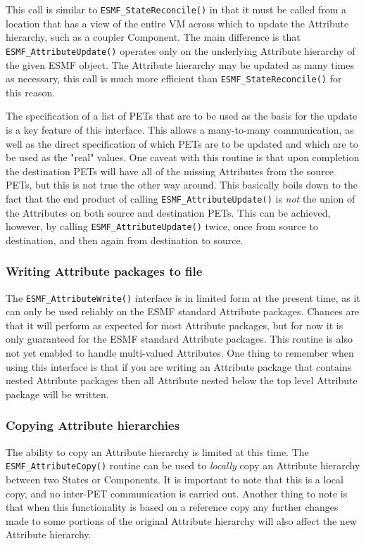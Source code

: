 This call is similar to {\tt ESMF\_StateReconcile()} in that it must be called from a location that has a view of the entire VM across which to update the Attribute hierarchy, such as a coupler Component.  The main difference is that {\tt ESMF\_AttributeUpdate()} operates only on the underlying Attribute hierarchy of the given ESMF object.  The Attribute hierarchy may be updated as many times as necessary, this call is much more efficient than {\tt ESMF\_StateReconcile()} for this reason.  

The specification of a list of PETs that are to be used as the basis for the update is a key feature of this interface.  This allows a many-to-many communication, as well as the direct specification of which PETs are to be updated and which are to be used as the "real" values.  One caveat with this routine is that upon completion the destination PETs will have all of the missing Attributes from the source PETs, but this is not true the other way around.  This basically boils down to the fact that the end product of calling {\tt ESMF\_AttributeUpdate()} is {\it not} the union of the Attributes on both source and destination PETs.  This can be achieved, however, by calling {\tt ESMF\_AttributeUpdate()} twice, once from source to destination, and then again from destination to source.

\subsubsection{Writing Attribute packages to file}

The {\tt ESMF\_AttributeWrite()} interface is in limited form at the present time, as it can only be used reliably on the ESMF standard Attribute packages.  Chances are that it will perform as expected for most Attribute packages, but for now it is only guaranteed for the ESMF standard Attribute packages.  This routine is also not yet enabled to handle multi-valued Attributes.    One thing to remember when using this interface is that if you are writing an Attribute package that contains nested Attribute packages then all Attribute nested below the top level Attribute package will be written.

\subsubsection{Copying Attribute hierarchies}
\label{sec:Att:Copy}

The ability to copy an Attribute hierarchy is limited at this time.  The {\tt ESMF\_AttributeCopy()} routine can be used to {\it locally} copy an Attribute hierarchy between two States or Components.  It is important to note that this is a local copy, and no inter-PET communication is carried out.  Another thing to note is that when this functionality is based on a reference copy any further changes made to some portions of the original Attribute hierarchy will also affect the new Attribute hierarchy.

